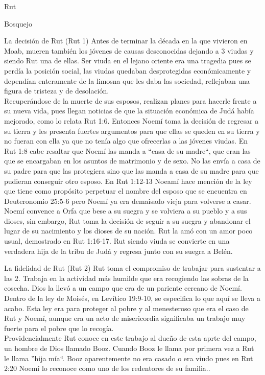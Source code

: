 \begin{section}{Rut}
\begin{subsection}{Bosquejo}
\begin{subsubsection}{La decisión de Rut (Rut 1)}
Antes de terminar la década en la que vivieron en Moab, mueren también los jóvenes de causas desconocidas dejando a 3 viudas y siendo Rut una de ellas. Ser viuda en el lejano oriente era una tragedia pues se perdía la posición social, las viudas quedaban desprotegidas económicamente y dependían enteramente de la limosna que les daba las sociedad, reflejaban una figura de tristeza y de desolación. \\
Recuperándose de la muerte de sus esposos, realizan planes para hacerle frente a su nueva vida, pues llegan noticias de que la situación económica de Judá había mejorado, como lo relata Rut 1:6.
\newpage
Entonces Noemí toma la decisión de regresar a su tierra y les presenta fuertes argumentos para que ellas se queden en su tierra y no fueran con ella ya que no tenía algo que ofrecerlas a las jóvenes viudas. En Rut 1:8 cabe resaltar que Noemí las manda a ``casa de su madre``, que eran las que se encargaban en los asuntos de matrimonio y de sexo. No las envía a casa de su padre para que las protegiera sino que las manda a casa de su madre para que pudieran conseguir otro esposo. En Rut 1:12-13 Noeamí hace mención de la ley que tiene como propósito perpetuar el nombre del esposo que se encuentra en Deuteronomio 25:5-6 pero Noemí ya era demaisado vieja para volverse a casar. Noemí convence a Orfa que bese a su suegra y se volviera  a su pueblo y a sus dioses, sin embargo, Rut toma la decisión de seguir a su suegra y abandonar el lugar de su nacimiento y los dioses de su nación. Rut la amó con un amor poco usual, demostrado en Rut 1:16-17. Rut siendo viuda se convierte en una verdadera hija de la tribu de Judá y regresa junto con su suegra a Belén.
		\end{subsubsection}
		\begin{subsubsection}{La fidelidad de Rut (Rut 2)}
				Rut toma el compromiso de trabajar para sustentar a las 2. Trabaja en la actividad más humilde que era recogiendo las sobras de la cosecha. Dios la llevó a un campo que era de un pariente cercano de Noemí. Dentro de la ley de Moisés, en Levítico 19:9-10, se especifica lo que aquí se lleva a acabo. Esta ley era para proteger al pobre y al menesteroso que era el caso de Rut y Noemí, aunque era un acto de misericordia significaba un trabajo muy fuerte para el pobre que lo recogía. \\
				Providencialmente Rut conoce en este trabajo al dueño de esta aprte del campo, un hombre de Dios llamado Booz. Cuando Booz le llama por primera vez a Rut le llama ''hija mía``. Booz aparentemente no era casado o era viudo pues en Rut 2:20 Noemí lo reconoce como uno de los redentores de su familia..\\

\end{subsubsection}
\end{subsection}
\end{section}
